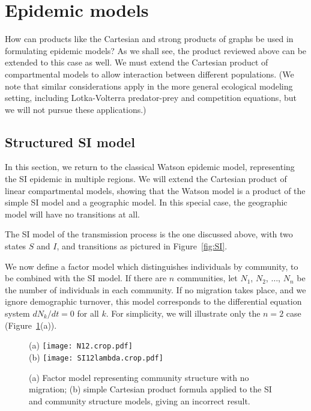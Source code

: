\documentclass[review]{elsarticle}
\newcommand{\hl}[1]{#1}
\begin{document}
\section{Epidemic models}
How can products like the Cartesian and strong products of graphs
be used in formulating epidemic models?  As we shall see,
the product reviewed above can be extended to this case as well.  We must
extend the Cartesian product of compartmental models to allow
interaction between different populations.  (We note that similar
considerations apply in the more general ecological modeling
setting, including Lotka-Volterra predator-prey and competition
equations, but we will not pursue these applications.)

\subsection{Structured SI model}

In this section, we return to the classical Watson epidemic model,
representing the SI epidemic in multiple regions.  We will extend the Cartesian product of 
linear compartmental models, showing that the Watson model is a product of
the simple SI model and a geographic model.  In this special case, the geographic
model will have no transitions at all.

The SI model of the transmission process
is the one discussed above, with two states
$S$ and $I$, and transitions as pictured in \hl{Figure~\mbox{\ref{fig:SI}}}.

We now define a factor model which distinguishes
individuals by community, to be combined with the SI model.
If there
are $n$ communities, let $N_1$, $N_2$, $\ldots$, $N_n$ be the number of
individuals in each community.  If no migration takes place, and we
ignore demographic turnover, this model corresponds to the differential
equation system ${dN_k}/{dt}=0$ for all $k$.
For simplicity, we will illustrate only the $n=2$ case
(\hl{Figure~\mbox{\ref{fig:SI-simple}(a)}}).



\begin{figure}
\centering
(a) %
\texttt{[image: N12.crop.pdf]}
%
\\
(b) %
\texttt{[image: SI12lambda.crop.pdf]}
%
\caption{ \label{fig:SI-simple}
(a) Factor model representing community structure with no migration;
(b) simple Cartesian product formula applied
to the SI and community structure models,
giving an incorrect result.
}
\end{figure}
\end{document}
